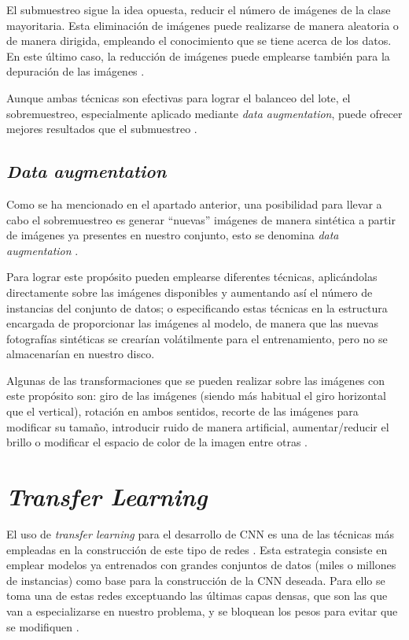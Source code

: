 El submuestreo sigue la idea opuesta, reducir el número de imágenes de la clase mayoritaria. Esta eliminación de imágenes puede realizarse de manera aleatoria o de manera dirigida, empleando el conocimiento que se tiene acerca de los datos. En este último caso, la reducción de imágenes puede emplearse también para la depuración de las imágenes \cite{underover:archive}.

Aunque ambas técnicas son efectivas para lograr el balanceo del lote, el sobremuestreo, especialmente aplicado mediante \textit{data augmentation}, puede ofrecer mejores resultados que el submuestreo \cite{underover:ieee}.

\subsection{\textit{Data augmentation}}

Como se ha mencionado en el apartado anterior, una posibilidad para llevar a cabo el sobremuestreo es generar ``nuevas'' imágenes de manera sintética a partir de imágenes ya presentes en nuestro conjunto, esto se denomina \textit{data augmentation} \cite{dataa:arxiv}. 

Para lograr este propósito pueden emplearse diferentes técnicas, aplicándolas directamente sobre las imágenes disponibles y aumentando así el número de instancias del conjunto de datos; o especificando estas técnicas en la estructura encargada de proporcionar las imágenes al modelo, de manera que las nuevas fotografías sintéticas se crearían volátilmente para el entrenamiento, pero no se almacenarían en nuestro disco.

Algunas de las transformaciones que se pueden realizar sobre las imágenes con este propósito son: giro de las imágenes (siendo más habitual el giro horizontal que el vertical), rotación en ambos sentidos, recorte de las imágenes para modificar su tamaño, introducir ruido de manera artificial, aumentar/reducir el brillo o modificar el espacio de color de la imagen entre otras \cite{dataa:springer}.

\section{\textit{Transfer Learning}}

El uso de \textit{transfer learning} para el desarrollo de CNN es una de las técnicas más empleadas en la construcción de este tipo de redes \cite{trans:ieee, trans:scihub}. Esta estrategia consiste en emplear modelos ya entrenados con grandes conjuntos de datos (miles o millones de instancias) como base para la construcción de la CNN deseada. Para ello se toma una de estas redes exceptuando las últimas capas densas, que son las que van a especializarse en nuestro problema, y se bloquean los pesos para evitar que se modifiquen \cite{trans:springer}.


